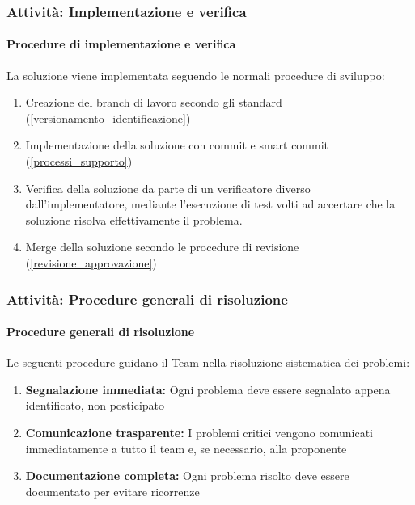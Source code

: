 \documentclass[a4paper,12pt]{article}
\begin{document}
\subsubsection{Attività: Implementazione e verifica}\label{implementazione_verifica}

\paragraph{Procedure di implementazione e verifica}
La soluzione viene implementata seguendo le normali procedure di sviluppo:
\begin{enumerate}
    \item Creazione del branch di lavoro secondo gli standard (\ref{versionamento_identificazione})
    \item Implementazione della soluzione con commit e smart commit (\ref{processi_supporto})
    \item Verifica della soluzione da parte di un verificatore diverso dall'implementatore, mediante 
    l'esecuzione di test volti ad accertare che la soluzione risolva effettivamente il problema.
    \item Merge della soluzione secondo le procedure di revisione (\ref{revisione_approvazione})
\end{enumerate}

\subsubsection{Attività: Procedure generali di risoluzione}\label{procedure_risoluzione}

\paragraph{Procedure generali di risoluzione}
Le seguenti procedure guidano il Team nella risoluzione sistematica dei problemi:
\begin{enumerate}
    \item \textbf{Segnalazione immediata:} Ogni problema deve essere segnalato appena identificato, non posticipato
    \item \textbf{Comunicazione trasparente:} I problemi critici vengono comunicati immediatamente a tutto il team e, se necessario, alla proponente
    \item \textbf{Documentazione completa:} Ogni problema risolto deve essere documentato per evitare ricorrenze
\end{enumerate}
\end{document}
